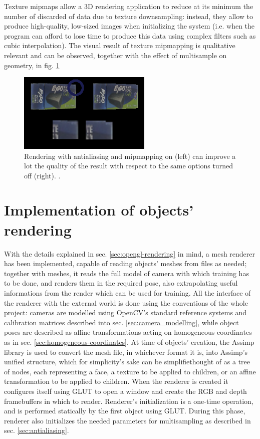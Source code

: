 Texture mipmaps allow a 3D rendering application to reduce at its minimum the
number of discarded of data due to texture downsampling: instead, they allow to
produce high-quality, low-sized images when initializing the system (i.e. when
the program can afford to lose time to produce this data using complex filters
such as cubic interpolation). The visual result of texture mipmapping is
qualitative relevant and can be observed, together with the effect of
multisample on geometry, in fig. \ref{fig:multisampling-on}

\begin{figure}[htbp]
  \centering
  \includegraphics[width=2.5in]{./Results/antialiasing}
  \caption{Rendering with antialiasing and mipmapping on (left)
  can improve a lot the quality of the result with respect to the same options
turned off (right). \label{fig:multisampling-on}.}
\end{figure}

\section{Implementation of objects' rendering} \label{sec:renderer3d}
With the details explained in sec. \ref{sec:opengl-rendering} in mind, a mesh renderer has been implemented, capable of
reading objects' meshes from files as needed; together with meshes, it reads the full model of
camera with which training has to be done, and renders them in the required
pose, also extrapolating useful informations from the render which can be used
for training. All the interface of the renderer with the external world is done
using the conventions of the whole project: cameras are modelled using OpenCV's
standard reference systems and calibration matrices described into sec.
\ref{sec:camera_modelling}, while object poses are described as affine
transformations acting on homogeneous coordinates as in sec.
\ref{sec:homogeneous-coordinates}. At time of objects' creation, the Assimp library
is used to convert the mesh file, in whichever format it is, into Assimp's
unified structure, which for simplicity's sake can be simplifiethought of as a tree of
nodes, each representing a face, a texture to be applied to children, or
an affine transformation to be applied to children. When the renderer is created
it configures itself using GLUT to open a window and create the RGB and depth
framebuffers in which to render. Renderer's initialization is a one-time
operation, and is performed statically by the first object using GLUT. During
this phase, renderer also initializes the needed parameters for multisampling as
described in sec. \ref{sec:antialiasing}.

